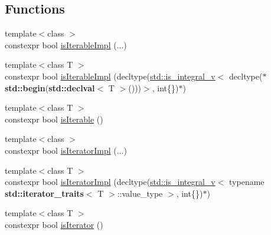 \subsection*{Functions}
{\bf }\par
\begin{DoxyCompactItemize}
\item 
{\footnotesize template$<$class $>$ }\\constexpr bool \hyperlink{namespacecnt_1_1help_aff9b7e2919a865791024719cf1b1443f}{is\+Iterable\+Impl} (...)
\item 
{\footnotesize template$<$class T $>$ }\\constexpr bool \hyperlink{namespacecnt_1_1help_a318111e0d993a2828a6891bc2ec7ff63}{is\+Iterable\+Impl} (decltype(\hyperlink{namespacestd_a824c5eb1a7e8aafa382dc9af3329a9e8}{std\+::is\+\_\+integral\+\_\+v}$<$ decltype($\ast${\bf std\+::begin}({\bf std\+::declval}$<$ T $>$()))$>$, int\{\})$\ast$)
\item 
{\footnotesize template$<$class T $>$ }\\constexpr bool \hyperlink{namespacecnt_1_1help_aeb5c3fce1a6876c4cefecde18ba7daf0}{is\+Iterable} ()
\end{DoxyCompactItemize}

{\bf }\par
\begin{DoxyCompactItemize}
\item 
{\footnotesize template$<$class $>$ }\\constexpr bool \hyperlink{namespacecnt_1_1help_a02c1f10402bc533c3130b68848768589}{is\+Iterator\+Impl} (...)
\item 
{\footnotesize template$<$class T $>$ }\\constexpr bool \hyperlink{namespacecnt_1_1help_a3832534d328c3ddd3b1510ef3fec7dc8}{is\+Iterator\+Impl} (decltype(\hyperlink{namespacestd_a824c5eb1a7e8aafa382dc9af3329a9e8}{std\+::is\+\_\+integral\+\_\+v}$<$ typename {\bf std\+::iterator\+\_\+traits}$<$ T $>$\+::value\+\_\+type $>$, int\{\})$\ast$)
\item 
{\footnotesize template$<$class T $>$ }\\constexpr bool \hyperlink{namespacecnt_1_1help_a8461005914a45b87910a6f36746eb4f4}{is\+Iterator} ()
\end{DoxyCompactItemize}

